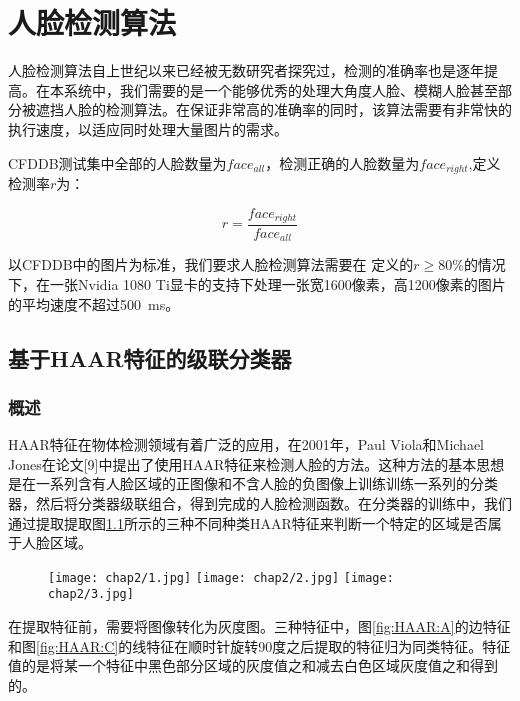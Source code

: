 \chapter{人脸检测算法}
\label{chap:facedetection}

人脸检测算法自上世纪以来已经被无数研究者探究过，检测的准确率也是逐年提高。在本系统中，我们需要的是一个能够优秀的处理大角度人脸、模糊人脸甚至部分被遮挡人脸的检测算法。在保证非常高的准确率的同时，该算法需要有非常快的执行速度，以适应同时处理大量图片的需求。

CFDDB测试集中全部的人脸数量为$face_{all}$，检测正确的人脸数量为$face_{right}$,定义检测率$r$为：

\begin{displaymath}
\label{eq:rdef}
	r = \frac{face_{right}}{face_{all}} 
\end{displaymath}

以CFDDB中的图片为标准，我们要求人脸检测算法需要在 定义的$r\geq 80\%$的情况下，在一张Nvidia 1080 Ti显卡的支持下处理一张宽1600像素，高1200像素的图片的平均速度不超过\SI{500}{ms}。


\section{基于HAAR特征的级联分类器}

\subsection{概述}
HAAR特征在物体检测领域有着广泛的应用，在2001年，Paul Viola和Michael Jones在论文[9]中提出了使用HAAR特征来检测人脸的方法。这种方法的基本思想是在一系列含有人脸区域的正图像和不含人脸的负图像上训练训练一系列的分类器，然后将分类器级联组合，得到完成的人脸检测函数。在分类器的训练中，我们通过提取提取图\ref{fig:HAAR}所示的三种不同种类HAAR特征来判断一个特定的区域是否属于人脸区域。

\begin{figure}[!htp]
	\centering
	{\texttt{[image: chap2/1.jpg]}}
	\hspace{4em}
	{\texttt{[image: chap2/2.jpg]}}
	\hspace{4em}
	{\texttt{[image: chap2/3.jpg]}}
	\label{fig:HAAR}
\end{figure}

在提取特征前，需要将图像转化为灰度图。三种特征中，图\ref{fig:HAAR:A}的边特征和图\ref{fig:HAAR:C}的线特征在顺时针旋转90度之后提取的特征归为同类特征。特征值的是将某一个特征中黑色部分区域的灰度值之和减去白色区域灰度值之和得到的。

